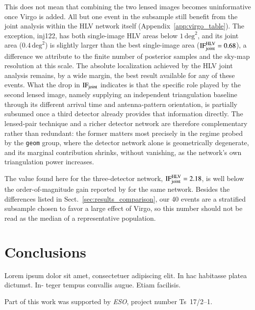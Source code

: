 \documentclass{aa}
\begin{document}
This does not mean that combining the two lensed images becomes
uninformative once Virgo is added. All but one event in the subsample still
benefit from the joint analysis within the HLV network itself
(Appendix~\ref{app:virgo_table}). The exception, inj122, has both
single-image HLV areas below $1\,\mathrm{deg}^2$, and its joint area
($0.4\,\mathrm{deg}^2$) is slightly larger than the best single-image area
($\mathrm{IF}_{\rm joint}^{\rm HLV} = 0.68$), a difference we attribute to
the finite number of posterior samples and the sky-map resolution at this
scale. The absolute localization achieved by the HLV joint analysis
remains, by a wide margin, the best result available for any of these
events. What the drop in $\mathrm{IF}_{\rm joint}$
indicates is that the specific role played by the second lensed image,
namely supplying an independent triangulation baseline through its
different arrival time and antenna-pattern orientation, is partially
subsumed once a third detector already provides that information directly.
The lensed-pair technique and a richer detector network are therefore
complementary rather than redundant: the former matters most precisely in
the regime probed by the \texttt{geom} group, where the detector network
alone is geometrically degenerate, and its marginal contribution shrinks,
without vanishing, as the network's own triangulation power increases.

The value found here for the three-detector network,
$\mathrm{IF}_{\rm joint}^{\rm HLV} = 2.18$, is well below the
order-of-magnitude gain reported by \citet{Hannuksela_skyloc} for the same
network. Besides the differences listed in
Sect.~\ref{sec:results_comparison}, our 40 events are a stratified
subsample chosen to favor a large effect of Virgo, so this number should
not be read as the median of a representative population.

\FloatBarrier

\section{Conclusions}
\label{sec:conclusions}
Lorem ipsum dolor sit amet,
consectetuer adipiscing elit. In hac habitasse platea dictumst. In-
teger tempus convallis augue. Etiam facilisis.

\begin{acknowledgements}
      Part of this work was supported by \emph{ESO}, project
      number Ts~17/2--1.
\end{acknowledgements}
\end{document}
